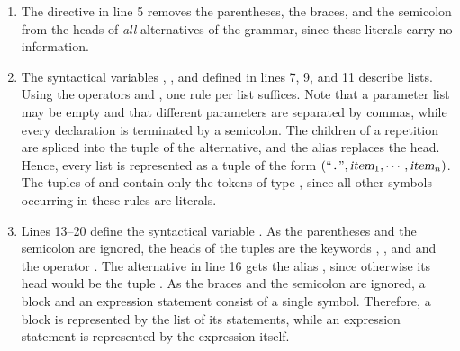 \begin{enumerate}
      The initial version of the programming language \texttt{C}, as detailed in the book
      ``\emph{The C Programming Language}'' \cite{kernighan:1978}, required that all variable declarations
      precede any statements, prohibiting the mixing of declarations and statements. While this limitation was
      lifted in subsequent versions of the language, our implementation still enforces this restriction.
\item The directive in line 5 removes the parentheses, the braces, and the semicolon from the heads of
      \emph{all} alternatives of the grammar, since these literals carry no information.
\item The syntactical variables , , and  defined in lines
      7, 9, and 11 describe lists.  Using the  operators \quoted{*} and , one rule per
      list suffices.  Note that a parameter list may be empty and that different parameters are separated by
      commas, while every declaration is terminated by a semicolon.  The children of a repetition are spliced
      into the tuple of the alternative, and the alias  replaces the head.  Hence, every list is
      represented as a tuple of the form $(\mbox{``\texttt{.}''}, \textsl{item}_1, \cdots, \textsl{item}_n)$.  The tuples
      of  and  contain only the tokens of type , since all other
      symbols occurring in these rules are literals.
\item Lines 13--20 define the syntactical variable .  As the parentheses and the semicolon are
      ignored, the heads of the tuples are the keywords , , and  and
      the operator \squoted{=}.  The alternative in line 16 gets the alias , since otherwise its
      head would be the tuple .  As the braces and the semicolon are ignored, a block and an
      expression statement consist of a single symbol.  Therefore, a block is represented by the list of its
      statements, while an expression statement is represented by the expression itself.


\end{enumerate}
